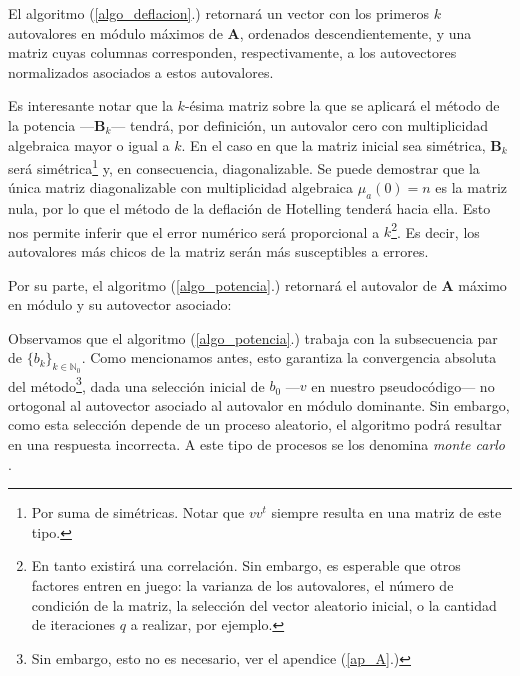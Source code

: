 \vspace{1em}


El algoritmo (\ref{algo_deflacion}.) retornará un vector con los primeros $k$ autovalores en módulo máximos de \textbf{A}, ordenados descendientemente, y una matriz cuyas columnas corresponden, respectivamente, a los autovectores normalizados asociados a estos autovalores. 

\vspace{1em}
Es interesante notar que la $k$-ésima matriz sobre la que se aplicará el método de la potencia ---\textbf{B}$_k$--- tendrá, por definición, un autovalor cero con multiplicidad algebraica mayor o igual a $k$. En el caso en que la matriz inicial sea simétrica, \textbf{B}$_k$ será simétrica\footnote{Por suma de simétricas. Notar que $v v^t$ siempre resulta en una matriz de este tipo.} y, en consecuencia, diagonalizable. Se puede demostrar que la única matriz diagonalizable con multiplicidad algebraica $\mu_{a}(0) = n$ es la matriz nula, por lo que el método de la deflación de Hotelling tenderá hacia ella. Esto nos permite inferir que el error numérico será proporcional a $k$\footnote{En tanto existirá una correlación. Sin embargo, es esperable que otros factores entren en juego: la varianza de los autovalores, el número de condición de la matriz, la selección del vector aleatorio inicial, o la cantidad de iteraciones $q$ a realizar, por ejemplo.}. Es decir, los autovalores más chicos de la matriz serán más susceptibles a errores.  


\vspace{2em}
\noindent Por su parte, el algoritmo (\ref{algo_potencia}.) retornará el autovalor de \textbf{A} máximo en módulo y su autovector asociado:

\vspace{1em}


\vspace{1em}
Observamos que el algoritmo (\ref{algo_potencia}.) trabaja con la subsecuencia par de $\{b_k\}_{k \in \mathbb{N}_0}$. Como mencionamos antes, esto garantiza la convergencia absoluta del método\footnote{Sin embargo, esto no es necesario, ver el apendice (\ref{ap_A}.)}, dada una selección inicial de $b_0$ ---$v$ en nuestro pseudocódigo--- no ortogonal al autovector asociado al autovalor en módulo dominante. Sin embargo, como esta selección depende de un proceso aleatorio, el algoritmo podrá resultar en una respuesta incorrecta. A este tipo de procesos se los denomina \textit{monte carlo} \cite{Brassard}. 

